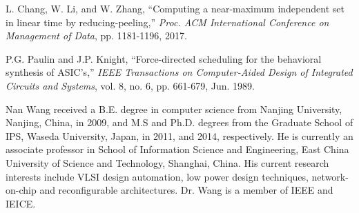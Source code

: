 \documentclass[10pt,journal, compsoc]{IEEEtran}
\begin{document}
\begin{thebibliography}{99}






L. Chang, W. Li, and W. Zhang,  ``Computing a near-maximum independent set in linear time by reducing-peeling,'' \textit{Proc. ACM International Conference on Management of Data}, pp. 1181-1196, 2017.



P.G. Paulin and J.P. Knight, ``Force-directed scheduling for the behavioral synthesis of ASIC's,''  \textit{IEEE Transactions on Computer-Aided Design of Integrated Circuits and Systems}, vol. 8, no. 6, pp. 661-679, Jun. 1989.




\end{thebibliography}

%

\begin{IEEEbiography}{Nan Wang}
received a B.E. degree in computer science from Nanjing University, Nanjing, China, in 2009, and M.S and Ph.D. degrees from the Graduate School of IPS, Waseda University, Japan, in 2011, and 2014, respectively. He is currently an associate professor in School of Information Science and Engineering, East China University of Science and Technology, Shanghai, China. His current research interests include VLSI design automation, low power design techniques, network-on-chip and reconfigurable architectures. Dr. Wang is a member of IEEE and IEICE.
\end{IEEEbiography}
\end{document}

